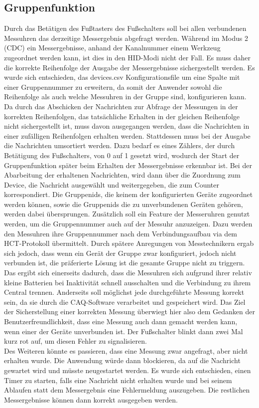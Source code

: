 \subsection{Gruppenfunktion}
Durch das Betätigen des Fußtasters des Fußschalters soll bei allen verbundenen Messuhren das derzeitige Messergebnis abgefragt werden. Während im Modus 2 (CDC) ein Messergebnisse, anhand der Kanalnummer einem Werkzeug zugeordnet werden kann, ist dies in den HID-Modi nicht der Fall. Es muss daher die korrekte Reihenfolge der Ausgabe der Messergebnisse sichergestellt werden. Es wurde sich entschieden, das devices.csv Konfigurationsfile um eine Spalte mit einer Gruppennummer zu erweitern, da somit der Anwender sowohl die Reihenfolge als auch welche Messuhren in der Gruppe sind, konfigurieren kann. Da durch das Abschicken der Nachrichten zur Abfrage der Messungen in der korrekten Reihenfolgen, das tatsächliche Erhalten in der gleichen Reihenfolge nicht sichergestellt ist, muss davon ausgegangen werden, dass die Nachrichten in einer zufälligen Reihenfolgen erhalten werden. Stattdessen muss bei der Ausgabe die Nachrichten umsortiert werden. Dazu bedarf es eines Zählers, der durch Betätigung des Fußschalters, von 0 auf 1 gesetzt wird, wodurch der Start der Gruppenfunktion später beim Erhalten der Messergebnisse erkennbar ist. Bei der Abarbeitung der erhaltenen Nachrichten, wird dann über die Zuordnung zum Device, die Nachricht ausgewählt und weitergegeben, die zum Counter korrespondiert. Die Gruppenids, die keinem der konfigurierten Geräte zugeordnet werden können, sowie die Gruppenids die zu unverbundenen Geräten gehören, werden dabei übersprungen. Zusätzlich soll ein Feature der Messeruhren genutzt werden, um die Gruppennummer auch auf der Messuhr anzuzeigen. Dazu werden den Messuhren ihre Gruppennummer nach dem Verbindungsaufbau via dem HCT-Protokoll übermittelt. Durch spätere Anregungen von Messtechnikern ergab sich jedoch, dass wenn ein Gerät der Gruppe zwar konfiguriert, jedoch nicht verbunden ist, die präferierte Lösung ist die gesamte Gruppe nicht zu triggern. Das ergibt sich einerseits dadurch, dass die Messuhren sich aufgrund ihrer relativ kleine Batterien bei Inaktivität schnell ausschalten und die Verbindung zu ihrem Central trennen. Anderseits soll möglichst jede durchgeführte Messung korrekt sein, da sie durch die CAQ-Software verarbeitet und gespeichert wird. Das Ziel der Sicherstellung einer korrekten Messung überwiegt hier also dem Gedanken der Benutzerfreundlichkeit, dass eine Messung auch dann gemacht werden kann, wenn einer der Geräte unverbunden ist. Der Fußschalter blinkt dann zwei Mal kurz rot auf, um diesen Fehler zu signalisieren.\\
Des Weiteren könnte es passieren, dass eine Messung zwar angefragt, aber nicht erhalten wurde. Die Anwendung würde dann blockieren, da auf die Nachricht gewartet wird und müsste neugestartet werden. Es wurde sich entschieden, einen Timer zu starten, falls eine Nachricht nicht erhalten wurde und bei seinem Ablaufen statt dem Messergebnis eine Fehlermeldung auszugeben. Die restlichen Messergebnisse können dann korrekt ausgegeben werden.
